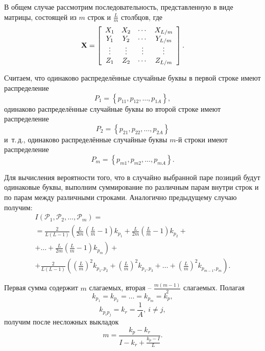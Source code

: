В общем случае рассмотрим последовательность, представленную в виде матрицы, состоящей из $m$ строк и $\frac{L}{m}$ столбцов, где
\[
{\mathbf X} = \left[ {\begin{array}{*{20}c}
   {X_1 } & {X_2 } &  \cdots  & {X_{L/m} }  \\
   {Y_1 } & {Y_2 } &  \cdots  & {Y_{L/m} }  \\
    \vdots  &  \vdots  &  \vdots  &  \vdots   \\
   {Z_1 } & {Z_2 } &  \cdots  & {Z_{L/m} }  \\
\end{array}} \right].
\]

Считаем, что одинаково распределённые случайные буквы в первой строке имеют распределение
    \[ P_1  = \left\{ {p_{11} ,p_{12} , \ldots , p_{1A} } \right\}, \]
одинаково распределённые случайные буквы во второй строке имеют распределение
    \[ P_2  = \left\{ {p_{21} ,p_{22} , \ldots , p_{2A} } \right\} \]
и~т.\,д., одинаково распределённые случайные буквы $m$-й строки имеют распределение
    \[ P_m  = \left\{ {p_{m1},p_{m2} , \ldots , p_{mA} } \right\}. \]

Для вычисления вероятности того, что в случайно выбранной паре позиций будут одинаковые буквы, выполним суммирование по различным парам внутри строк и по парам между различными строками. Аналогично предыдущему случаю получим:
\begin{multline*}
I(\mathcal{P}_1, \mathcal{P}_2, \ldots, \mathcal{P}_m ) = \\
= \frac{2}{L(L - 1)} \left( \frac{L}{2m} \left( \frac{L}{m} - 1 \right) k_{p_1} + \frac{L}{2m} \left( \frac{L}{m} - 1 \right) k_{p_2} + \right. \\
+ \dots + \left. \frac{L}{2m} \left( \frac{L}{m} - 1 \right) k_{p_m} \right) + \\
+ \frac{2}{L(L - 1)} \left( \left( \frac{L}{m} \right)^2 k_{p_1, p_2} + \left( \frac{L}{m} \right)^2 k_{p_1, p_3} + \dots + \left( \frac{L}{m} \right)^2 k_{p_{m - 1}, p_m } \right).
\end{multline*}

Первая сумма содержит $m$ слагаемых, вторая -- $ \frac{m(m-1)}{2}$ слагаемых. Полагая
    \[ k_{p_1} = k_{p_2} = \dots = k_{p_m} = k_p, \]
    \[ k_{p_i p_j } = k_r = \frac{1}{A}, ~ i \ne j, \]
получим после несложных выкладок
    \[ m = \frac{k_p  - k_r}{I - k_r  + \frac{k_p  - I}{L}}. \]
